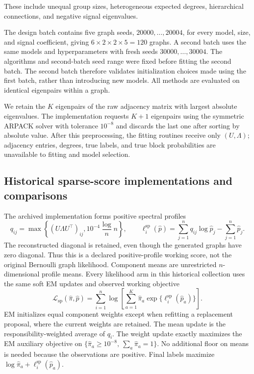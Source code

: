 \documentclass[11pt]{article}
\theoremstyle{definition}
\theoremstyle{remark}
\numberwithin{equation}{section}
\begin{document}
These include unequal group sizes, heterogeneous expected degrees,
hierarchical connections, and negative signal eigenvalues.

The design batch contains five graph seeds, $20000,\ldots,20004$, for every
model, size, and signal coefficient, giving $6\times2\times2\times5=120$
graphs. A second batch uses the same models and hyperparameters with fresh
seeds $30000,\ldots,30004$. The algorithms and second-batch seed range were
fixed before fitting the second batch. The second batch therefore validates
initialization choices made using the first batch, rather than introducing
new models. All methods are evaluated on identical eigenpairs within a graph.

We retain the $K$ eigenpairs of the raw adjacency matrix with largest absolute
eigenvalues. The implementation requests $K+1$ eigenpairs using the symmetric
ARPACK solver with tolerance $10^{-8}$ and discards the last one after
sorting by absolute value. After this preprocessing, the fitting routines receive
only $(U,\Lambda)$; adjacency entries, degrees, true labels, and true block
probabilities are unavailable to fitting and model selection.

\subsection{Historical sparse-score implementations and comparisons}

The archived implementation forms positive spectral profiles
\begin{equation}
 q_{ij}=\max\left\{(U\Lambda U^\top)_{ij},
                   10^{-4}\frac\log n{n}\right\},\qquad
 \ell_i^{\mathrm{sp}}(\widehat p)=\sum_{j=1}^n q_{ij}\log\widehat p_j-\sum_{j=1}^n\widehat p_j.
 \label{eq:experimental_working_score}
\end{equation}
The reconstructed diagonal is retained, even though the generated graphs
have zero diagonal. Thus this is a declared positive-profile working score,
not the original Bernoulli graph likelihood. Component means are unrestricted
$n$-dimensional profile means. Every likelihood arm in this historical collection uses the same soft EM
updates and observed working objective
\begin{equation}
 \mathcal L_{\mathrm{sp}}(\widehat\pi,\widehat p)=\sum_{i=1}^n\log\left[
   \sum_{a=1}^K \widehat\pi_a\exp\{\ell_i^{\mathrm{sp}}(\widehat p_a)\}\right].
\end{equation}
EM initializes equal component weights except when refitting a replacement
proposal, where the current weights are retained. The mean update is the
responsibility-weighted average of $q_i$. The weight update exactly maximizes
the EM auxiliary objective on $\{\widehat\pi_a\ge10^{-8},\ \sum_a \widehat\pi_a=1\}$.
No additional floor on means is needed because the observations are positive.
Final labels maximize $\log \widehat\pi_a+\ell_i^{\mathrm{sp}}(\widehat p_a)$.
\end{document}
